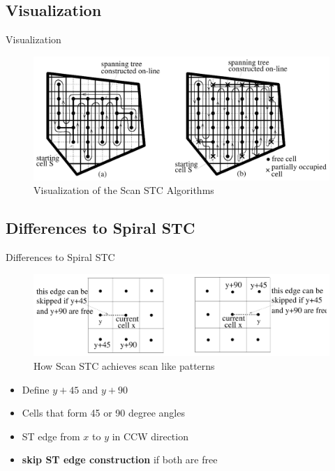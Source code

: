 \documentclass{beamer}
\begin{document}
\subsection{Visualization}
\begin{frame}{Visualization}
    \begin{figure}
        \includegraphics[width=\linewidth]{Images/inv_fig7.png}
        \caption{Visualization of the Scan STC Algorithms}
    \end{figure}
\end{frame}

\subsection{Differences to Spiral STC}
\begin{frame}{Differences to Spiral STC}
    \begin{figure}
        \includegraphics[width=\linewidth]{Images/inv_fig6.png}
        \caption{How Scan STC achieves scan like patterns}
    \end{figure}
    \begin{itemize}
        \item Define $y + 45$ and $y + 90$
        \item Cells that form 45 or 90 degree angles
        \item ST edge from $x$ to $y$ in CCW direction
        \item \textbf{skip ST edge construction} if both are free
    \end{itemize}
\end{frame}
\end{document}
